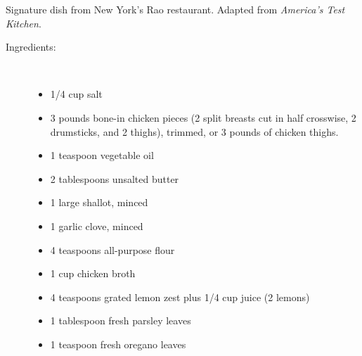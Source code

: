 \documentclass[11pt,letterpaper]{article}
\begin{document}



Signature dish from New York's Rao restaurant. Adapted from {\it America's Test Kitchen}.

\begin{description}

\item[Ingredients:]\ \\
	\begin{itemize}
	\item 1/4 cup salt
	\item 3 pounds bone-in chicken pieces (2 split breasts cut in half crosswise, 2 drumsticks, and 2 thighs), trimmed, or 3 pounds of chicken thighs.
	\item 1	teaspoon vegetable oil
	\item 2	tablespoons unsalted butter
	\item 1	large shallot, minced
	\item 1	garlic clove, minced
	\item 4	teaspoons all-purpose flour
	\item 1	cup chicken broth
	\item 4	teaspoons grated lemon zest plus 1/4 cup juice (2 lemons)
	\item 1	tablespoon fresh parsley leaves
	\item 1	teaspoon fresh oregano leaves
	\end{itemize}


\end{description}
\end{document}
